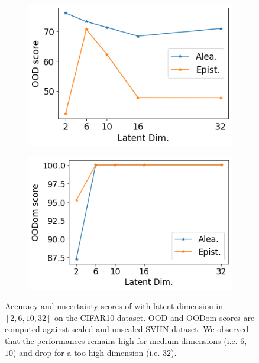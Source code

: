 \begin{figure}[ht]
    \begin{subfigure}[t]{0.33 \textwidth}
        \centering
        \includegraphics[width=1. \textwidth]{sections/006_neurips2020/figures/lat_dim_cifar10_ood_1.png}
    \end{subfigure}%
    \begin{subfigure}[t]{0.33 \textwidth}
        \centering
        \includegraphics[width=1. \textwidth]{sections/006_neurips2020/figures/lat_dim_cifar10_ood_2.png}
    \end{subfigure}%

    \caption{Accuracy and uncertainty scores of \PostNetacro with latent dimension in $[2, 6, 10, 32]$ on the CIFAR10 dataset. OOD and OODom scores are computed against scaled and unscaled SVHN dataset. We observed that the performances remains high for medium dimensions (i.e. $6$, $10$) and drop for a too high dimension (i.e. $32$).}
    \label{fig:latent_dim_CIFAR10}
\end{figure}
